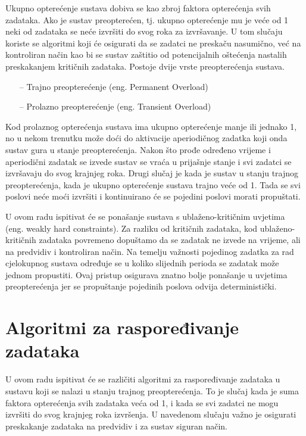 \documentclass[../zavrsni.tex]{subfiles}
\begin{document}
Ukupno opterećenje sustava dobiva se kao zbroj faktora opterećenja svih zadataka. Ako je sustav preopterećen, tj. ukupno opterećenje mu 
je veće od 1 neki od zadataka se neće izvršiti do svog roka za izvršavanje. U tom slučaju koriste se algoritmi koji će osigurati 
da se zadatci ne preskaču nasumično, već na kontroliran način kao bi se sustav zaštitio od potencijalnih oštećenja nastalih preskakanjem 
kritičnih zadataka. Postoje dvije vrste preopterećenja sustava.
\begin{itemize}
    \item[--] Trajno preopterećenje (eng. Permanent Overload)
    \item[--] Prolazno preopterećenje (eng. Transient Overload)
\end{itemize}
Kod prolaznog opterećenja sustava ima ukupno opterećenje manje ili jednako 1, no u nekom trenutku može doći do aktivacije aperiodičnog zadatka 
koji onda sustav gura u stanje preopterećenja. Nakon što prođe određeno vrijeme i aperiodični zadatak se izvede sustav se vraća u prijašnje
stanje i svi zadatci se izvršavaju do svog krajnjeg roka. Drugi slučaj je kada je sustav u stanju trajnog preopterećenja, kada je ukupno 
opterećenje sustava trajno veće od 1. Tada se svi poslovi neće moći izvršiti i kontinuirano će se pojedini poslovi morati propuštati. 


U ovom radu ispitivat će se ponašanje sustava s ublaženo-kritičnim uvjetima (eng. weakly hard constraints). Za razliku od 
kritičnih zadataka, kod ublaženo-kritičnih zadataka povremeno dopuštamo da se zadatak ne izvede na vrijeme, ali na predvidiv i 
kontroliran način. Na temelju važnosti pojedinog zadatka za rad cjelokupnog sustava određuje se u koliko slijednih perioda 
se zadatak može jednom propustiti. Ovaj pristup osigurava znatno bolje ponašanje u uvjetima preopterećenja jer se propuštanje
pojedinih poslova odvija deterministički.

\section{Algoritmi za raspoređivanje zadataka}

U ovom radu ispitivat će se različiti algoritmi za raspoređivanje zadataka u sustavu koji se nalazi u stanju trajnog preopterećenja.
To je slučaj kada je suma faktora opterećenja svih zadataka veća od 1, i kada se svi zadatci ne mogu izvršiti do svog krajnjeg roka 
izvršenja. U navedenom slučaju važno je osigurati preskakanje zadataka na predvidiv i za sustav siguran način.
\end{document}
